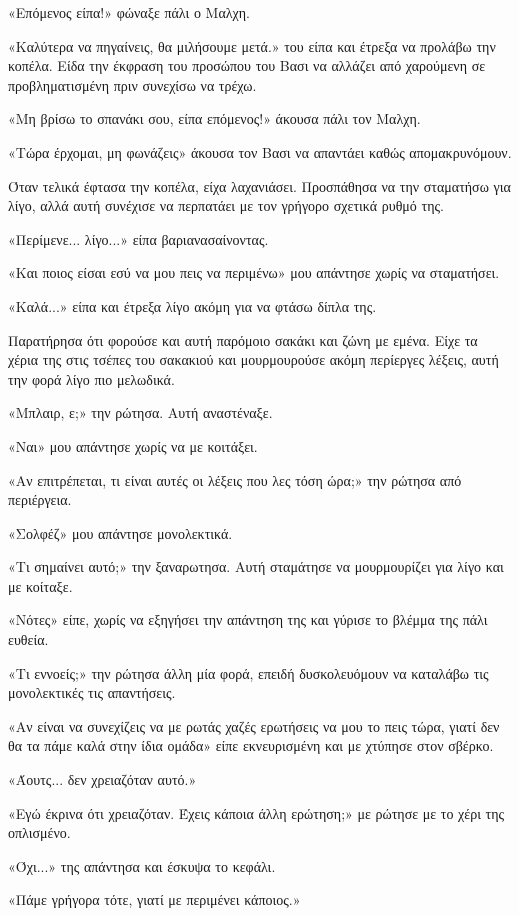 \documentclass[12pt,twoside, openany]{book}
\begin{document}
«Επόμενος είπα!» φώναξε πάλι ο Μαλχη.

«Καλύτερα να πηγαίνεις, θα μιλήσουμε μετά.» του είπα και έτρεξα να προλάβω την κοπέλα. Είδα την έκφραση του προσώπου του Βασι να αλλάζει από χαρούμενη σε προβληματισμένη πριν συνεχίσω να τρέχω.

«Μη βρίσω το σπανάκι σου, είπα επόμενος!» άκουσα πάλι τον Μαλχη.

«Τώρα έρχομαι, μη φωνάζεις» άκουσα τον Βασι να απαντάει καθώς απομακρυνόμουν.

Όταν τελικά έφτασα την κοπέλα, είχα λαχανιάσει. Προσπάθησα να την σταματήσω για λίγο, αλλά αυτή συνέχισε να περπατάει με τον γρήγορο σχετικά ρυθμό της.

«Περίμενε... λίγο...» είπα βαριανασαίνοντας.

«Και ποιος είσαι εσύ να μου πεις να περιμένω» μου απάντησε χωρίς να σταματήσει. 

«Καλά...» είπα και έτρεξα λίγο ακόμη για να φτάσω δίπλα της.

Παρατήρησα ότι φορούσε και αυτή παρόμοιο σακάκι και ζώνη με εμένα. Είχε τα χέρια της στις τσέπες του σακακιού και μουρμουρούσε ακόμη περίεργες λέξεις, αυτή την φορά λίγο πιο μελωδικά.

«Μπλαιρ, ε;» την ρώτησα. Αυτή αναστέναξε.

«Ναι» μου απάντησε χωρίς να με κοιτάξει.

«Αν επιτρέπεται, τι είναι αυτές οι λέξεις που λες τόση ώρα;» την ρώτησα από περιέργεια.

«Σολφέζ» μου απάντησε μονολεκτικά.

«Τι σημαίνει αυτό;» την ξαναρωτησα. Αυτή σταμάτησε να μουρμουρίζει για λίγο και με κοίταξε.

«Νότες» είπε, χωρίς να εξηγήσει την απάντηση της και γύρισε το βλέμμα της πάλι ευθεία.

«Τι εννοείς;» την ρώτησα άλλη μία φορά, επειδή δυσκολευόμουν να καταλάβω τις μονολεκτικές τις απαντήσεις.

«Αν είναι να συνεχίζεις να με ρωτάς χαζές ερωτήσεις να μου το πεις τώρα, γιατί δεν θα τα πάμε καλά στην ίδια ομάδα» είπε εκνευρισμένη και με χτύπησε στον σβέρκο.

«Άουτς... δεν χρειαζόταν αυτό.»

«Εγώ έκρινα ότι χρειαζόταν. Έχεις κάποια άλλη ερώτηση;» με ρώτησε με το χέρι της οπλισμένο.

«Όχι...» της απάντησα και έσκυψα το κεφάλι.

«Πάμε γρήγορα τότε, γιατί με περιμένει κάποιος.»
\end{document}

